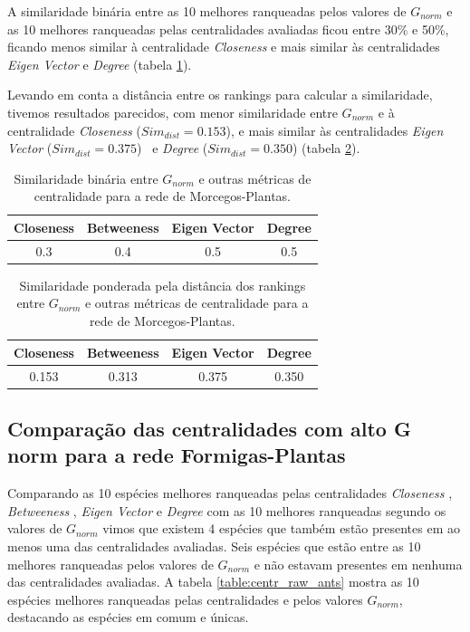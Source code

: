 \documentclass[
  12pt,
]{article}
\begin{document}
A similaridade binária entre as 10 melhores ranqueadas pelos valores de
\(G_{norm}\) e as 10 melhores ranqueadas pelas centralidades avaliadas
ficou entre 30\% e 50\%, ficando menos similar à centralidade
\textit{Closeness} e mais similar às centralidades \textit{Eigen Vector}
e \textit{Degree} (tabela \ref{table:centr_sim_bin_bats}).

Levando em conta a distância entre os rankings para calcular a
similaridade, tivemos resultados parecidos, com menor similaridade entre
\(G_{norm}\) e à centralidade \textit{Closeness}
(\(Sim_{dist} = 0.153\)), e mais similar às centralidades
\textit{Eigen Vector} (\(Sim_{dist} = 0.375\)) ~e \textit{Degree}
(\(Sim_{dist} = 0.350\)) (tabela \ref{table:centr_sim_dist_bats}).

\begin{table}[!ht]
\caption{Similaridade binária entre $G_{norm}$ e outras métricas de centralidade para a rede de Morcegos-Plantas.}\label{table:centr_sim_bin_bats}
\centering
\begin{tabular}{cccc}
\hline
Closeness & Betweeness & Eigen Vector & Degree\\
\hline
\hline
0.3 & 0.4 & 0.5 & 0.5\\
\hline
\end{tabular}
\end{table}

\begin{table}[!ht]
\caption{Similaridade ponderada pela distância dos rankings entre $G_{norm}$ e outras métricas de centralidade para a rede de Morcegos-Plantas.}\label{table:centr_sim_dist_bats}
\centering
\begin{tabular}{cccc}
\hline
Closeness & Betweeness & Eigen Vector & Degree \\
\hline
\hline
0.153 & 0.313 & 0.375 & 0.350 \\
\hline
\end{tabular}
\end{table}

\hypertarget{comparauxe7uxe3o-das-centralidades-com-alto-g-norm-para-a-rede-formigas-plantas}{%
\subsection{Comparação das centralidades com alto G norm para a rede
Formigas-Plantas}\label{comparauxe7uxe3o-das-centralidades-com-alto-g-norm-para-a-rede-formigas-plantas}}

Comparando as 10 espécies melhores ranqueadas pelas centralidades
\textit{Closeness} , \textit{Betweeness} , \textit{Eigen Vector} e
\textit{Degree} com as 10 melhores ranqueadas segundo os valores de
\(G_{norm}\) vimos que existem 4 espécies que também estão presentes em
ao menos uma das centralidades avaliadas. Seis espécies que estão entre
as 10 melhores ranqueadas pelos valores de \(G_{norm}\) e não estavam
presentes em nenhuma das centralidades avaliadas. A tabela
\ref{table:centr_raw_ants} mostra as 10 espécies melhores ranqueadas
pelas centralidades e pelos valores \(G_{norm}\), destacando as espécies
em comum e únicas.
\end{document}
